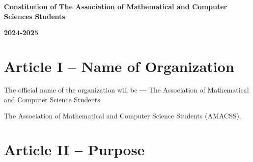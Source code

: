 \documentclass[12pt,a4paper]{article}
\begin{document}
\begin{center}
\Large\textbf{Constitution of The Association of Mathematical and Computer Sciences Students}

\vspace{0.5cm}
\large\textbf{2024-2025}
\end{center}

\vspace{1cm}

\section{Article I – Name of Organization}

\begin{constitutionlist}
\item The official name of the organization will be ― The Association of Mathematical and Computer Science Students.

\item The Association of Mathematical and Computer Science Students (AMACSS).
\end{constitutionlist}

\section{Article II – Purpose}
\end{document}
